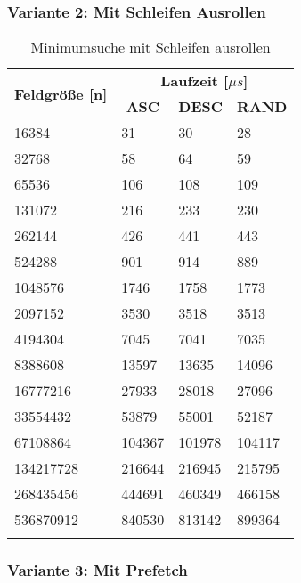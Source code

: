 \newpage

\subsubsection{Variante 2: Mit Schleifen Ausrollen}

\begin{center}
	\begin{longtable}{|p{5cm}|p{3cm}|p{3cm}|p{3cm}|}
		\hline
		
		\multirow{2}{5cm}{\centering \textbf{Feldgröße [n]}} & \multicolumn{3}{|c|}{ \textbf{Laufzeit [$\mu s$]}} \\\cline{2-4}
		& \multicolumn{1}{|c|}{\textbf{ASC}} & \multicolumn{1}{|c|}{\textbf{DESC}} &\multicolumn{1}{|c|}{\textbf{RAND}} \\
		\hhline{|=|=|=|=|}
		
		16384 & 31 & 30 & 28\\
		\hline
		32768 & 58 & 64 & 59\\
		\hline
		65536 & 106 & 108 & 109\\
		\hline
		131072 & 216 & 233 & 230\\
		\hline
		262144 & 426 & 441 & 443\\
		\hline
		524288 & 901 & 914 & 889\\
		\hline
		1048576 & 1746 & 1758 & 1773\\
		\hline
		2097152 & 3530 & 3518 & 3513\\
		\hline
		4194304 & 7045 & 7041 & 7035\\
		\hline
		8388608 & 13597 & 13635 & 14096\\
		\hline
		16777216 & 27933 & 28018 & 27096\\
		\hline
		33554432 & 53879 & 55001 & 52187\\
		\hline
		67108864 & 104367 & 101978 & 104117\\
		\hline
		134217728 & 216644 & 216945 & 215795\\
		\hline
		268435456 & 444691 & 460349 & 466158\\
		\hline
		536870912 & 840530 & 813142 & 899364\\
		\hline
		
		\caption{Minimumsuche mit Schleifen ausrollen}
		\label{tab:minimumsearch-v2}
	\end{longtable}
\end{center}

\newpage

\subsubsection{Variante 3: Mit Prefetch}

